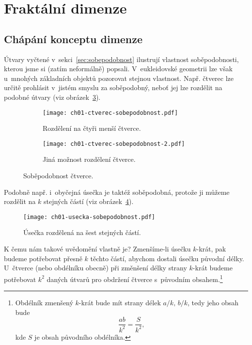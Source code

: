 \section{Fraktální dimenze}\label{sec:fraktalni_dimenze}

\subsection{Chápání konceptu dimenze}\label{subsec:koncept-dimenze}

Útvary vyčtené v~sekci~\ref{sec:sobepodobnost} ilustrují vlastnost soběpodobnosti, kterou jsme si (zatím neformálně) popsali. V~eukleidovské geometrii lze však u~mnohých základních objektů pozorovat stejnou vlastnost. Např. čtverec lze určitě prohlásit v~jistém smyslu za soběpodobný, neboť jej lze rozdělit na podobné útvary (viz obrázek~\ref{fig:sobepodobnost-ctverce}).
\begin{figure}[h]
    \centering
    \begin{subfigure}[b]{\subfigwidth}
        \centering
        \texttt{[image: ch01-ctverec-sobepodobnost.pdf]}
        \caption{Rozdělení na čtyři menší čtverce.}
        \label{subfig:sobepodobnost-ctverce-1}
    \end{subfigure}
    \begin{subfigure}[b]{\subfigwidth}
        \centering
        \texttt{[image: ch01-ctverec-sobepodobnost-2.pdf]}
        \caption{Jiná možnost rozdělení čtverce.}
        \label{subfig:sobepodobnost-ctverce-2}
    \end{subfigure}
    \caption{Soběpodobnost čtverce.}
    \label{fig:sobepodobnost-ctverce}
\end{figure}
Podobně např. i~obyčejná úsečka je taktéž soběpodobná, protože ji můžeme rozdělit na $k$ stejných částí (viz obrázek~\ref*{fig:sobepodobnost-usecky}).\par
\begin{figure}[h]
    \centering
    \texttt{[image: ch01-usecka-sobepodobnost.pdf]}
    \caption{Úsečka rozdělená na šest stejných částí.}
    \label{fig:sobepodobnost-usecky}
\end{figure}
K čemu nám takové uvědomění vlastně je? Zmenšíme-li úsečku $k$-krát, pak budeme potřebovat přesně $k$ těchto částí, abychom dostali úsečku původní délky. U~čtverce (nebo obdélníku obecně) při změnšení délky strany $k$-krát budeme potřebovat $k^2$ daných útvarů pro obdržení čtverce s~původním obsahem.\footnote{Obdélník zmenšený $k$-krát bude mít strany délek $a/k,\,b/k$, tedy jeho obsah bude
\[\dfrac{ab}{k^2}=\dfrac{S}{k^2},\]
kde $S$ je obsah původního obdélníka.}
